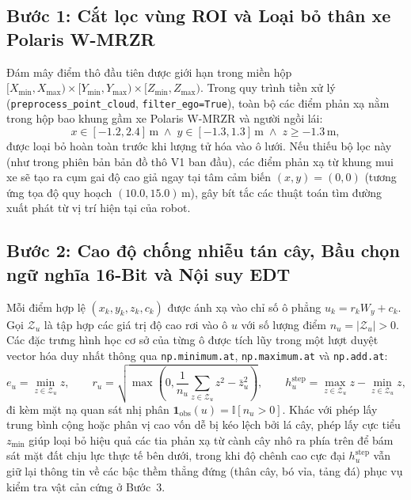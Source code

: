 \documentclass[a4paper,fleqn]{cas-sc}
\begin{document}
\subsection{Bước 1: Cắt lọc vùng ROI và Loại bỏ thân xe Polaris W-MRZR}
Đám mây điểm thô đầu tiên được giới hạn trong miền hộp $[X_{\min}, X_{\max}) \times [Y_{\min}, Y_{\max}) \times [Z_{\min}, Z_{\max})$. Trong quy trình tiền xử lý (\texttt{preprocess\_point\_cloud}, \texttt{filter\_ego=True}), toàn bộ các điểm phản xạ nằm trong hộp bao khung gầm xe Polaris W-MRZR và người ngồi lái:
\begin{equation}
    x \in [-1.2, 2.4]\,\text{m} \;\land\; y \in [-1.3, 1.3]\,\text{m} \;\land\; z \ge -1.3\,\text{m},
\end{equation}
được loại bỏ hoàn toàn trước khi lượng tử hóa vào ô lưới. Nếu thiếu bộ lọc này (như trong phiên bản bản đồ thô V1 ban đầu), các điểm phản xạ từ khung mui xe sẽ tạo ra cụm gai độ cao giả ngay tại tâm cảm biến $(x, y) = (0, 0)$ (tương ứng tọa độ quy hoạch $(10.0, 15.0)\,\text{m}$), gây bít tắc các thuật toán tìm đường xuất phát từ vị trí hiện tại của robot.

\subsection{Bước 2: Cao độ chống nhiễu tán cây, Bầu chọn ngữ nghĩa 16-Bit và Nội suy EDT}
Mỗi điểm hợp lệ $(x_k, y_k, z_k, c_k)$ được ánh xạ vào chỉ số ô phẳng $u_k = r_k W_y + c_k$. Gọi $\mathcal{Z}_u$ là tập hợp các giá trị độ cao rơi vào ô $u$ với số lượng điểm $n_u = |\mathcal{Z}_u| > 0$. Các đặc trưng hình học cơ sở của từng ô được tích lũy trong một lượt duyệt vector hóa duy nhất thông qua \texttt{np.minimum.at}, \texttt{np.maximum.at} và \texttt{np.add.at}:
\begin{equation}
    e_u = \min_{z \in \mathcal{Z}_u} z, \qquad
    r_u = \sqrt{\max\left(0, \frac{1}{n_u}\sum_{z \in \mathcal{Z}_u} z^2 - \bar{z}_u^2\right)}, \qquad
    h^{\text{step}}_u = \max_{z \in \mathcal{Z}_u} z - \min_{z \in \mathcal{Z}_u} z,
\end{equation}
đi kèm mặt nạ quan sát nhị phân $\mathbf{1}_{\text{obs}}(u) = \mathbb{I}[n_u > 0]$. Khác với phép lấy trung bình cộng hoặc phân vị cao vốn dễ bị kéo lệch bởi lá cây, phép lấy cực tiểu $z_{\min}$ giúp loại bỏ hiệu quả các tia phản xạ từ cành cây nhô ra phía trên để bám sát mặt đất chịu lực thực tế bên dưới, trong khi độ chênh cao cực đại $h^{\text{step}}_u$ vẫn giữ lại thông tin về các bậc thềm thẳng đứng (thân cây, bó vỉa, tảng đá) phục vụ kiểm tra vật cản cứng ở Bước~3.
\end{document}

